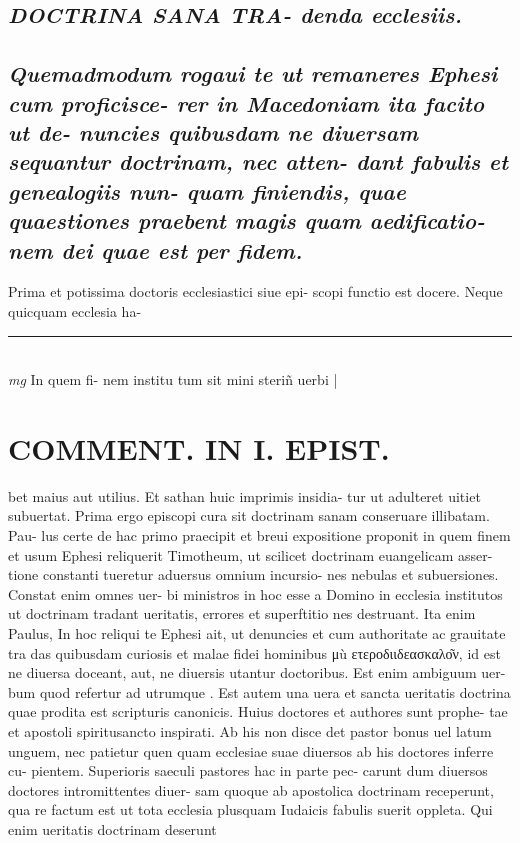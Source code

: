\documentclass{article}
\begin{document}
\begin{pages}
\subsection*{\textit{DOCTRINA SANA TRA- denda ecclesiis. }}
{}
\subsection*{\textit{Quemadmodum rogaui te ut remaneres Ephesi cum proficisce- rer in Macedoniam ita facito ut de- nuncies quibusdam ne diuersam sequantur doctrinam, nec atten- dant fabulis et genealogiis nun- quam finiendis, quae quaestiones praebent magis quam aedificatio- nem dei quae est per fidem. }}\pstart Prima et potissima doctoris ecclesiastici siue epi- scopi functio est docere. Neque quicquam ecclesia ha-  \pend
\vspace{0.5cm}\noindent
\vspace{0.2cm}\rule{1cm}{0.2pt}\\ 
\hspace{0.2cm}\textit{mg}
\footnotesize In quem fi- nem institu tum sit mini steriñ uerbi 
\normalsize| 
\section*{COMMENT. IN I. EPIST. }\pstart bet maius aut utilius. Et sathan huic imprimis insidia- tur ut adulteret uitiet subuertat. Prima ergo episcopi cura sit doctrinam sanam conseruare illibatam. Pau- lus certe de hac primo praecipit et breui expositione proponit in quem finem et usum Ephesi reliquerit Timotheum, ut scilicet doctrinam euangelicam asser- tione constanti tueretur aduersus omnium incursio- nes nebulas et subuersiones. Constat enim omnes uer- bi ministros in hoc esse a Domino in ecclesia institutos ut doctrinam tradant ueritatis, errores et superftitio nes destruant. Ita enim Paulus, In hoc reliqui te Ephesi ait, ut denuncies et cum authoritate ac grauitate tra das quibusdam curiosis et malae fidei hominibus μù ετεροδιιδεασκαλο͂ν, id est ne diuersa doceant, aut, ne diuersis utantur doctoribus. Est enim ambiguum uer- bum quod refertur ad utrumque . Est autem una uera et sancta ueritatis doctrina quae prodita est scripturis canonicis. Huius doctores et authores sunt prophe- tae et apostoli spiritusancto inspirati. Ab his non disce det pastor bonus uel latum unguem, nec patietur quen quam ecclesiae suae diuersos ab his doctores inferre cu- pientem. Superioris saeculi pastores hac in parte pec- carunt dum diuersos doctores intromittentes diuer- sam quoque ab apostolica doctrinam receperunt, qua re factum est ut tota ecclesia plusquam Iudaicis fabulis suerit oppleta. Qui enim ueritatis doctrinam deserunt  \pend

\end{pages}
\end{document}
